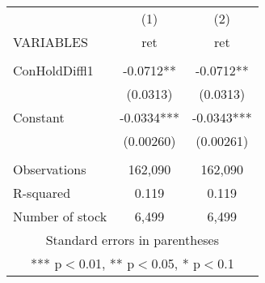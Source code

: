 \documentclass[]{article}
\begin{document}
\begin{tabular}{lcc} \hline
 & (1) & (2) \\
VARIABLES & ret & ret \\ \hline
 &  &  \\
ConHoldDiffl1 & -0.0712** & -0.0712** \\
 & (0.0313) & (0.0313) \\
Constant & -0.0334*** & -0.0343*** \\
 & (0.00260) & (0.00261) \\
 &  &  \\
Observations & 162,090 & 162,090 \\
R-squared & 0.119 & 0.119 \\
 Number of stock & 6,499 & 6,499 \\ \hline
\multicolumn{3}{c}{ Standard errors in parentheses} \\
\multicolumn{3}{c}{ *** p$<$0.01, ** p$<$0.05, * p$<$0.1} \\
\end{tabular}
\end{document}
